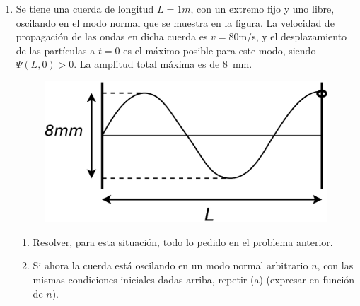 \documentclass[11pt,spanish,a4paper]{article}
\begin{document}
\begin{enumerate}
\item Se tiene una cuerda de longitud $L=1\unit{m}$, con un extremo fijo y uno
libre, oscilando en el modo normal que se muestra en la figura. La
velocidad de propagación de las ondas en dicha cuerda es $v=80$\unit{m/s},
y el desplazamiento de las partículas a $t=0$ es el máximo posible
para este modo, siendo $\Psi(L,0)>0$. La amplitud total máxima es
de \SI{8}{mm}.
\begin{figure}[H]
\centering{}\includegraphics[clip,scale=0.25]{ej1-33}
\end{figure}
\begin{enumerate}
	\item Resolver, para esta situación, todo lo pedido en el problema anterior. 
	\item Si ahora la cuerda está oscilando en un modo normal arbitrario $n$,
con las mismas condiciones iniciales dadas arriba, repetir (a) (expresar
en función de $n$).
\end{enumerate}


\end{enumerate}
\end{document}

